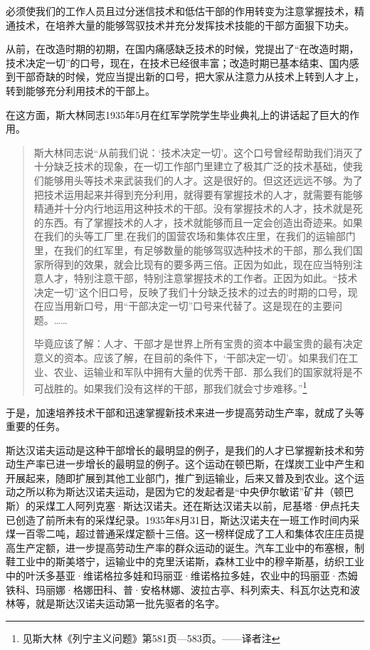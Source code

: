 必须使我们的工作人员且过分迷信技术和低估干部的作用转变为注意掌握技术，精通技术，在培养大量的能够驾驭技术并充分发挥技术技能的干部方面狠下功夫。

从前，在改造时期的初期，在国内痛感缺乏技术的时候，党提出了“在改造时期，技术决定一切”的口号，现在，在技术已经很丰富；改造时期已基本结束、国内感到干部奇缺的时候，党应当提出新的口号，把大家从注意力从技术上转到人才上，转到能够充分利用技术的干部上。

在这方面，斯大林同志1935年5月在红军学院学生毕业典礼上的讲话起了巨大的作用。

\begin{quotation}
斯大林同志说“从前我们说：‘技术决定一切’。这个口号曾经帮助我们消灭了十分缺乏技术的现象，在一切工作部门里建立了极其广泛的技术基础，使我们能够用头等技术来武装我们的人才。这是很好的。但这还远远不够。为了把技术运用起来并得到充分利用，就得要有掌握技术的人才，就需要有能够精通并十分内行地运用这种技术的干部。没有掌握技术的人才，技术就是死的东西。有了掌握技术的人才，技术就能够而且一定会创造出奇迹来。如果在我们的头等工厂里,在我们的国营农场和集体农庄里，在我们的运输部门里，在我们的红军里，有足够数量的能够驾驭选种技术的干部，那么我们国家所得到的效果，就会比现有的要多两三倍。正因为如此，现在应当特别注意人才，特别注意干部，特别注意掌握技术的工作者。正因为如此。“技术决定一切”这个旧口号，反映了我们十分缺乏技术的过去的时期的口号，现在应当用新口号，用“干部决定一切”口号来代替了。这是现在的主要问题。……

毕竟应该了解：人才、干部才是世界上所有宝贵的资本中最宝贵的最有决定意义的资本。应该了解，在目前的条件下，‘干部决定一切’。如果我们在工业、农业、运输业和军队中拥有大量的优秀干部．那么我们的国家就将是不可战胜的。如果我们没有这样的干部，那我们就会寸步难移。”\footnote{见斯大林《列宁主义问题》第581页—583页。——译者注}
\end{quotation}

于是，加速培养技术干部和迅速掌握新技术来进一步提高劳动生产率，就成了头等重要的任务。

斯达汉诺夫运动是这种干部增长的最明显的例子，是我们的人才已掌握新技术和劳动生产率已进一步增长的最明显的例子。这个运动在顿巴斯，在煤炭工业中产生和开展起来，随即扩展到其他工业部门，推广到运输业，后来又普及到农业。这个运动之所以称为斯达汉诺夫运动，是因为它的发起者是“中央伊尔敏诺”矿井（顿巴斯）的采煤工人阿列克塞·斯达汉诺夫。还在斯达汉诺夫以前，尼基塔·伊点托夫已创造了前所未有的采煤纪录。1935年8月31日，斯达汉诺夫在一班工作时间内采煤一百零二吨，超过普通采煤定额十三倍。这一榜样促成了工人和集体农庄庄员提高生产定额，进一步提高劳动生产率的群众运动的诞生。汽车工业中的布塞根，制鞋工业中的斯美塔宁，运输业中的克里沃诺斯，森林工业中的穆辛斯基，纺织工业中的叶沃多基亚·维诺格拉多娃和玛丽亚·维诺格拉多娃，农业中的玛丽亚·杰姆铁科、玛丽娜·格娜田科、普·安格林娜、波拉古亭、科列索夫、科瓦尔达克和波林等，就是斯达汉诺夫运动第一批先驱者的名字。

